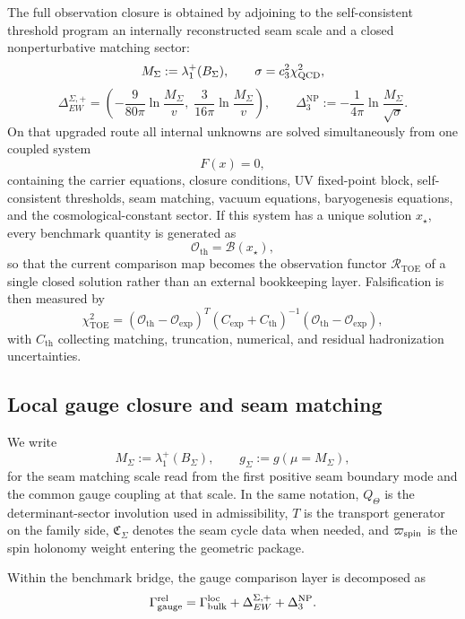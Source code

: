 \begin{conjecture}
The full observation closure is obtained by adjoining to the self-consistent
threshold program an internally reconstructed seam scale and a closed
nonperturbative matching sector:
\[
M_\Sigma:=\lambda_1^+(B_\Sigma),
\qquad
\sigma=c_3^2\chi_{\mathrm{QCD}}^2,
\]
\[
\Delta_{EW}^{\Sigma,+}
=
\left(
-\frac{9}{80\pi}\ln\frac{M_\Sigma}{v},
\;
\frac{3}{16\pi}\ln\frac{M_\Sigma}{v}
\right),
\qquad
\Delta_3^{\mathrm{NP}}
:=
-\frac{1}{4\pi}\ln\frac{M_\Sigma}{\sqrt{\sigma}}.
\]
On that upgraded route all internal unknowns are solved simultaneously from one
coupled system
\[
F(x)=0,
\]
containing the carrier equations, closure conditions, UV fixed-point block,
self-consistent thresholds, seam matching, vacuum equations, baryogenesis
equations, and the cosmological-constant sector. If this system has a unique
solution $x_\star$, every benchmark quantity is generated as
\[
\mathcal O_{\mathrm{th}}=\mathcal B(x_\star),
\]
so that the current comparison map becomes the observation functor
$\mathcal R_{\mathrm{TOE}}$ of a single closed solution rather than an external
bookkeeping layer. Falsification is then measured by
\[
\chi^2_{\mathrm{TOE}}
=
(\mathcal O_{\mathrm{th}}-\mathcal O_{\mathrm{exp}})^T
(C_{\mathrm{exp}}+C_{\mathrm{th}})^{-1}
(\mathcal O_{\mathrm{th}}-\mathcal O_{\mathrm{exp}}),
\]
with $C_{\mathrm{th}}$ collecting matching, truncation, numerical, and residual
hadronization uncertainties.
\end{conjecture}

\subsection{Local gauge closure and seam matching}

\begin{definition}
We write
\[
M_\Sigma:=\lambda_1^+(B_\Sigma),
\qquad
g_\Sigma:=g(\mu=M_\Sigma),
\]
for the seam matching scale read from the first positive seam boundary mode and the common gauge coupling at that scale. In the same notation, $Q_\Theta$ is the determinant-sector involution used in admissibility, $T$ is the transport generator on the family side, $\mathfrak C_\Sigma$ denotes the seam cycle data when needed, and $\varpi_{\mathrm{spin}}$ is the spin holonomy weight entering the geometric package.
\end{definition}

Within the benchmark bridge, the gauge comparison layer is decomposed as
\begin{equation}
\label{eq:relative-gauge-split}
\Gamma_{\mathrm{gauge}}^{\mathrm{rel}}
=
\Gamma_{\mathrm{bulk}}^{\mathrm{loc}}
+
\Delta_{EW}^{\Sigma,+}
+
\Delta_3^{\mathrm{NP}}.
\end{equation}

